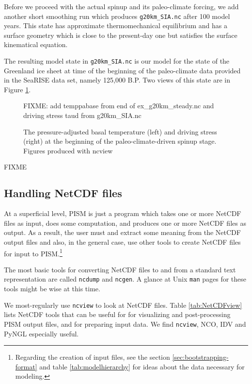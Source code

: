 Before we proceed with the actual spinup and its paleo-climate forcing, we add another short smoothing run which produces \texttt{g20km_SIA.nc} after 100 model years.  This state has approximate thermomechanical equilibrium and has a surface geometry which is close to the present-day one but satisfies the surface kinematical equation.

The resulting model state in \texttt{g20km_SIA.nc} is our model for the state of the Greenland ice sheet at time of the beginning of the paleo-climate data provided in the SeaRISE data set, namely 125,000 B.P.  Two views of this state are in Figure \ref{fig:sr-spinstart}.

\begin{figure}[ht]
\centering
FIXME: add temppabase from end of ex_g20km_steady.nc and driving stress taud from g20km_SIA.nc
\caption{The pressure-adjusted basal temperature (left) and driving stress (right) at the beginning of the paleo-climate-driven spinup stage.  Figures produced with ncview}
\label{fig:sr-spinstart}
\end{figure}



FIXME





\subsection{Handling NetCDF files}\label{subsect:nctoolsintro}  At a superficial level, PISM is just a program which takes one or more NetCDF files as input, does some computation, and produces one or more NetCDF files as output.  As a result, the user must and extract some meaning from the NetCDF output files and also, in the general case, use other tools to create NetCDF files for input to PISM.\footnote{Regarding the creation of input files, see the section \ref{sec:bootstrapping-format} and table \ref{tab:modelhierarchy} for ideas about the data necessary for modeling.}

The most basic tools for converting NetCDF files to and from a standard text representation are called \texttt{ncdump} and \texttt{ncgen}.  A glance at Unix \texttt{man} pages for these tools might be wise at this time.

We most-regularly use \texttt{ncview} to look at NetCDF files.  Table \ref{tab:NetCDFview} lists NetCDF tools that can be useful for for visualizing and post-processing PISM output files, and for preparing input data.  We find \texttt{ncview}, NCO, IDV and PyNGL especially useful.

